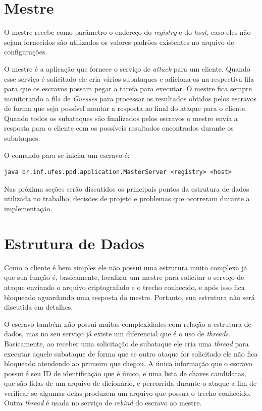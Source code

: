 \documentclass[
	12pt,				%
    oneside,			%
	a4paper,			%
	english,			%
	brazil,				%
	]{abntex2}
\begin{document}
\section{Mestre}

O mestre recebe como parâmetro o endereço do \textit{registry} e do \textit{host}, caso eles não sejam fornecidos são utilizados os valores padrões existentes no arquivo de configurações.

O mestre é a aplicação que fornece o serviço de \textit{attack} para um cliente. Quando esse serviço é solicitado
ele cria vários subataques e adiciona-os na respectiva fila para que os escravos possam pegar a tarefa para executar.
O mestre fica sempre monitorando a fila de \textit{Guesses} para processar os resultados obtidos pelos escravos de forma que seja possível montar a resposta ao final do ataque para o cliente.
Quando todos os subataques são finalizados pelos escravos o mestre envia a resposta para o cliente com os possíveis resultados encontrados durante os subataques.

O comando para se iniciar um escravo é:

\begin{lstlisting}
java br.inf.ufes.ppd.application.MasterServer <registry> <host>\end{lstlisting}

Nas próxima seções serão discutidos os principais pontos da estrutura de dados utilizada no trabalho, decisões de projeto e 
problemas que ocorreram durante a implementação.

\section{Estrutura de Dados}

Como o cliente é bem simples ele não possui uma estrutura muito complexa já que sua função é, basicamente, localizar um mestre para solicitar o serviço de ataque enviando o arquivo criptografado e o trecho conhecido, e após isso fica bloqueado aguardando uma resposta do mestre. Portanto, sua estrutura não será discutida em detalhes.

O escravo também não possuí muitas complexidades com relação a estrutura de dados, mas no seu serviço já existe um 
diferencial que é o uso de \textit{threads}. Basicamente, ao receber uma solicitação de subataque ele cria uma \textit{thread} para executar aquele subataque de forma que se outro ataque for solicitado ele não fica bloqueado atendendo ao primeiro que chegou.
A única informação que o escravo possui é seu ID de identificação que é único, e uma lista de chaves candidatas, que são lidas de um arquivo de dicionário, e percorrida durante o ataque a fim de verificar se algumas delas produzem um arquivo que possua o trecho conhecido. Outra \textit{thread} é usada no serviço de \textit{rebind} do escravo ao mestre.
\end{document}
